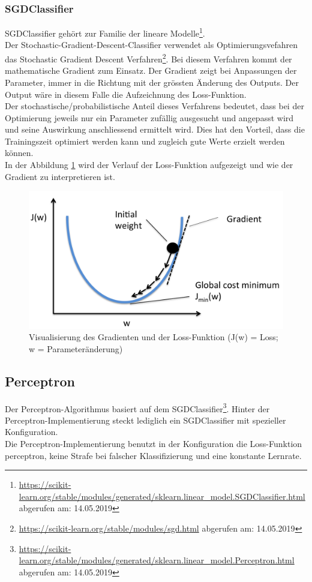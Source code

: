 \subsubsection{SGDClassifier}
SGDClassifier gehört zur Familie der lineare Modelle\footnote{\url{https://scikit-learn.org/stable/modules/generated/sklearn.linear_model.SGDClassifier.html} abgerufen am: 14.05.2019}\cite{scikit-learn}.\\
Der \glqq Stochastic-Gradient-Descent-Classifier\grqq{} verwendet als Optimierungsvefahren das \glqq Stochastic Gradient Descent\grqq{} Verfahren\footnote{\url{https://scikit-learn.org/stable/modules/sgd.html} abgerufen am: 14.05.2019}.
Bei diesem Verfahren kommt der mathematische Gradient zum Einsatz.
Der Gradient zeigt bei Anpassungen der Parameter, immer in die Richtung mit der grössten Änderung des Outputs.
Der Output wäre in diesem Falle die Aufzeichnung des Loss-Funktion.\\
Der stochastische/probabilistische Anteil dieses Verfahrens bedeutet, dass bei der Optimierung jeweils nur ein Parameter zufällig ausgesucht und angepasst wird und seine Auswirkung anschliessend ermittelt wird.
Dies hat den Vorteil, dass die Trainingszeit optimiert werden kann und zugleich gute Werte erzielt werden können.\\
In der Abbildung \cref{fig:sgd} wird der Verlauf der Loss-Funktion aufgezeigt und wie der Gradient zu interpretieren ist.
\begin{figure}[H]	
	\includegraphics[width=1\columnwidth,keepaspectratio]{img/sgd.png}
	\caption{Visualisierung des Gradienten und der Loss-Funktion (J(w) = Loss; w = Parameteränderung)}
	\label{fig:sgd}
\end{figure}
\subsection{Perceptron}
Der Perceptron-Algorithmus basiert auf dem SGDClassifier\footnote{\url{https://scikit-learn.org/stable/modules/generated/sklearn.linear_model.Perceptron.html} abgerufen am: 14.05.2019}\cite{scikit-learn}.
Hinter der Perceptron-Implementierung steckt lediglich ein SGDClassifier mit spezieller Konfiguration.\\
Die Perceptron-Implementierung benutzt in der Konfiguration die Loss-Funktion \glqq perceptron\grqq{}, keine Strafe bei falscher Klassifizierung und eine konstante Lernrate.
